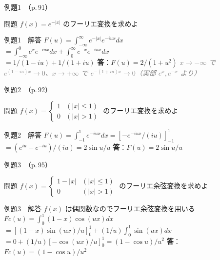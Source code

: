 \documentclass[professionalfonts]{beamer}
\begin{document}
\begin{frame}{例題1　（p.\,91）}
  \begin{exampleblock}{問題}
    $f(x) = e^{-|x|}$ のフーリエ変換を求めよ\\[2pt]
  \end{exampleblock}
\end{frame}

\begin{frame}{例題1　解答}
  $F(u) = \int_{-\infty}^{\infty} e^{-|x|} e^{-iux} dx$\\[4pt]
  $= \int_{-\infty}^{0} e^{x} e^{-iux} dx + \int_{0}^{\infty} e^{-x} e^{-iux} dx$\\[4pt]
  $= 1/(1-iu) + 1/(1+iu)$
  \medskip\textbf{答}：$F(u) = 2/(1+u^{2})$
  {\footnotesize \textcolor{gray}{\textit{$x\to-\infty$ で $e^{(1-iu)x}\to 0$、$x\to+\infty$ で $e^{-(1+iu)x}\to 0$（実部 $e^x, e^{-x}$ より）}}}
\end{frame}

\begin{frame}{例題2　（p.\,92）}
  \begin{exampleblock}{問題}
    $f(x) = \begin{cases} 1 & (|x| \leq 1) \\ 0 & (|x| > 1) \end{cases}$ のフーリエ変換を求めよ\\[2pt]
  \end{exampleblock}
\end{frame}

\begin{frame}{例題2　解答}
  $F(u) = \int_{-1}^{1} e^{-iux} dx = [-e^{-iux}/(iu)]_{-1}^{1}$\\[4pt]
  $= (e^{iu} - e^{-iu})/(iu) = 2\sin u / u$
  \medskip\textbf{答}：$F(u) = 2\sin u / u$
\end{frame}

\begin{frame}{例題3　（p.\,95）}
  \begin{exampleblock}{問題}
    $f(x) = \begin{cases} 1-|x| & (|x| \leq 1) \\ 0 & (|x| > 1) \end{cases}$ のフーリエ余弦変換を求めよ\\[2pt]
  \end{exampleblock}
\end{frame}

\begin{frame}{例題3　解答}
  $f(x)$ は偶関数なのでフーリエ余弦変換を用いる\\[4pt]
  $Fc(u) = \int_{0}^{1} (1-x) \cos(ux) dx$\\[4pt]
  $= [(1-x)\sin(ux)/u]_{0}^1 + (1/u)\int_{0}^1 \sin(ux) dx$\\[4pt]
  $= 0 + (1/u)[-\cos(ux)/u]_{0}^1 = (1-\cos u)/u^{2}$
  \medskip\textbf{答}：$Fc(u) = (1-\cos u)/u^{2}$
\end{frame}
\end{document}
